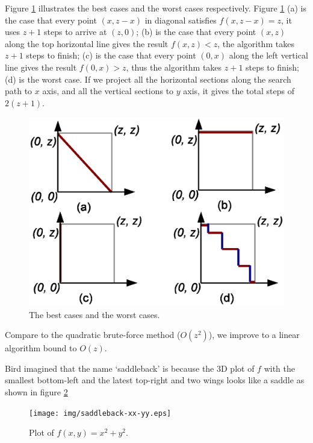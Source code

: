 \documentclass[UTF8]{article}
\begin{document}
Figure \ref{fig:saddleback-1-cases} illustrates the best cases and the worst cases respectively. Figure
\ref{fig:saddleback-1-cases} (a) is the case that every point $(x, z-x)$ in diagonal satisfies $f(x, z-x) = z$,
it uses $z+1$ steps to arrive at $(z, 0)$; (b) is the case that every point $(x, z)$ along the top
horizontal line gives the result $f(x, z) < z$, the algorithm takes $z+1$ steps to finish; (c) is
the case that every point $(0, x)$ along the left vertical line gives the result $f(0, x) > z$, thus
the algorithm takes $z+1$ steps to finish; (d) is the worst case. If we project all the horizontal
sections along the search path to $x$ axis, and all the vertical sections to $y$ axis, it
gives the total steps of $2(z+1)$.

\begin{figure}[htbp]
 \centering
 \includegraphics[scale=0.5]{img/saddleback-1-cases.eps}
 \caption{The best cases and the worst cases.}
 \label{fig:saddleback-1-cases}
\end{figure}

Compare to the quadratic brute-force method ($O(z^2)$), we improve to a linear algorithm bound to $O(z)$.

Bird imagined that the name `saddleback' is because the 3D plot of $f$ with the smallest bottom-left and the
latest top-right and two wings looks like a saddle as shown in figure \ref{fig:saddleback-frame}
\begin{figure}[htbp]
 \centering
 \texttt{[image: img/saddleback-xx-yy.eps]}
 \caption{Plot of $f(x, y) = x^2 + y^2$.}
 \label{fig:saddleback-frame}
\end{figure}
\end{document}
